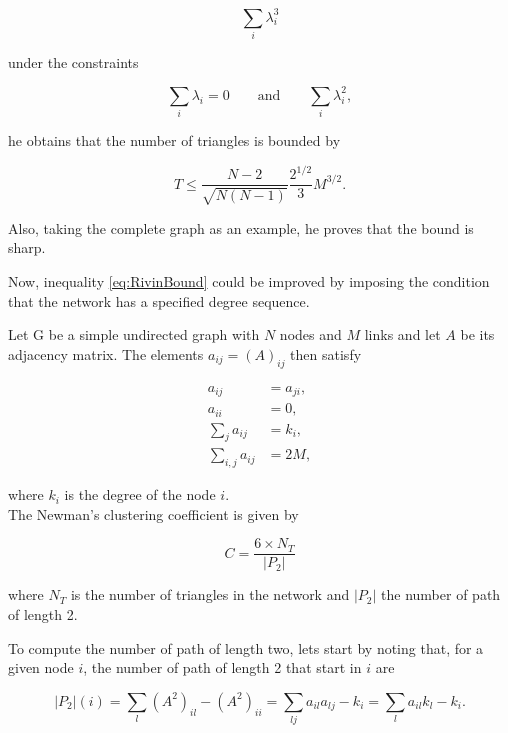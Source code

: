\documentclass{article}
\begin{document}
\begin{equation}
    \sum_i \lambda_i^3
\end{equation}

under the constraints

\begin{equation}
    \sum_i \lambda_i = 0\qquad \text{and} \qquad \sum_i \lambda_i^2,
\end{equation}

he obtains that the number of triangles is bounded by

\begin{equation} \label{eq:RivinBound}
    T \leq \dfrac{N-2}{\sqrt{N (N-1)}} \dfrac{2^{1/2}}{3} M^{3/2}.
\end{equation}

Also, taking the complete graph as an example, he proves that the bound is sharp.

Now, inequality \ref{eq:RivinBound} could be improved by imposing the condition that the network has a specified degree sequence.

Let G be a simple undirected graph with $N$ nodes and $M$ links and let $A$ be its adjacency matrix. The elements $a_{ij}=(A)_{ij}$ then satisfy

\begin{align}
    a_{ij} &= a_{ji}, \\
    a_{ii} &= 0, \\
    \sum_{j} a_{ij} &= k_i, \\
    \sum_{i, j} a_{ij} &= 2M,
\end{align}

where $k_i$ is the degree of the node $i$.
\\

The Newman's clustering coefficient is given by

\begin{equation}
    C = \dfrac{6 \times N_T}{|P_2|} 
\end{equation}

where $N_T$ is the number of triangles in the network and $|P_2|$ the number of path of length 2.

To compute the number of path of length two, lets start by noting that, for a given node $i$, the number of path of length 2 that start in $i$ are

\begin{equation}
    |P_2|(i) = \sum_{l} (A^2)_{il} - (A^2)_{ii}=  \sum_{lj} a_{il} a_{lj} - k_i = \sum_{l} a_{il} k_l - k_i.
\end{equation}
\end{document}
